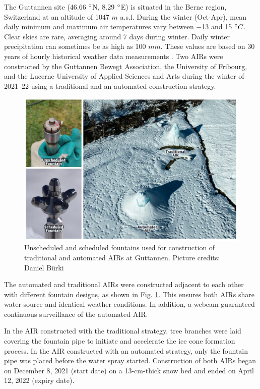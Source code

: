 \documentclass[tc, manuscript]{copernicus}
\begin{document}
The Guttannen site (46.66 $^{\circ}$N, 8.29 $^{\circ}$E) is situated in the Berne region, Switzerland at an
altitude of 1047 $m$ a.s.l. During the winter (Oct-Apr), mean daily minimum and maximum air temperatures vary
between $-$13 and 15 $^{\circ} C$. Clear skies are rare, averaging around 7 days during winter. Daily winter
precipitation can sometimes be as high as 100 $mm$. These values are based on 30 years of hourly historical
weather data measurements \citep{meteoblueClimateGuttannen2021}. Two AIRs were constructed by the Guttannen
Bewegt Association, the University of Fribourg, and the Lucerne University of Applied Sciences and Arts during
the winter of 2021--22 using a traditional and an automated construction strategy.

\begin{figure}[htb]
\includegraphics[width=12cm]{Figures/AIR_fountains.jpg}
\caption{Unscheduled and scheduled fountains used for construction of traditional and automated AIRs at Guttannen. Picture credits: Daniel Bürki}
\label{fig:2AIR}
\end{figure}

The automated and traditional AIRs were constructed adjacent to each other with different fountain
designs, as shown in Fig. \ref{fig:2AIR}. This ensures both AIRs share water source and identical
weather conditions. In addition, a webcam guaranteed continuous surveillance of the automated AIR.   

In the AIR constructed with the traditional strategy, tree branches were laid covering the fountain pipe to initiate and
accelerate the ice cone formation process. In the AIR constructed with an automated strategy, only the fountain pipe was placed before the
water spray started. Construction of both AIRs began on December 8, 2021 (start date) on a 13-cm-thick snow bed 
and ended on April 12, 2022 (expiry date).
\end{document}
